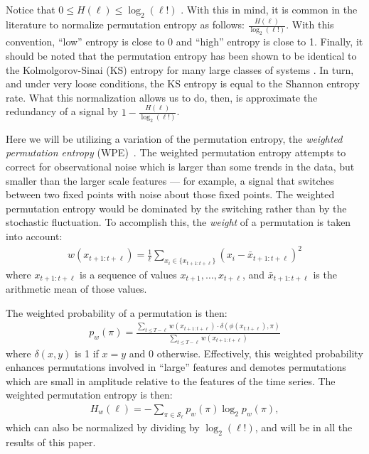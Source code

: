 Notice that $0\le H(\ell) \le \log_2(\ell!)$ \cite{bandt2002per}.  With this in mind, it is common in the literature to normalize permutation entropy as follows: $\frac{H(\ell)}{\log_2(\ell!)}$.  With this convention, ``low'' entropy is close to 0 and ``high'' entropy is close to 1. Finally, it should be noted that the permutation entropy has been shown to be identical to the Kolmolgorov-Sinai (KS) entropy for many large classes of systems \cite{amigo2012permutation}. In turn, and under very loose conditions, the KS entropy is equal to the Shannon entropy rate. What this normalization allows us to do, then, is approximate the redundancy of a signal by $1 - \frac{H(\ell)}{\log_2(\ell!)}$.

Here we will be utilizing a variation of the permutation entropy, the \emph{weighted permutation entropy} (WPE)~\cite{fadlallah2013}. The weighted permutation entropy attempts to correct for observational noise which is larger than some trends in the data, but smaller than the larger scale features --- for example, a signal that switches between two fixed points with noise about those fixed points. The weighted permutation entropy would be dominated by the switching rather than by the stochastic fluctuation. To accomplish this, the \emph{weight} of a permutation is taken into account:
\begin{align*}
  w(x_{t+1:t+\ell}) = \frac{1}{\ell} \sum_{x_i \in \{x_{t+1:t+\ell}\}}
                      \left( x_i - \bar{x}_{t+1:t+\ell} \right)^2
\end{align*}
where $x_{t+1:t+\ell}$ is a sequence of values $x_{t+1}, \ldots, x_{t+\ell}$, and $\bar{x}_{t+1:t+\ell}$ is the arithmetic mean of those values.

The weighted probability of a permutation is then:
\begin{align*}
  p_w(\pi) = \frac{\displaystyle \sum_{t \le T - \ell} w(x_{t+1:t+\ell}) \cdot \delta(\phi(x_{t:t+\ell}), \pi) }{\displaystyle \sum_{t \le T - \ell} w(x_{t+1:t+\ell})}
\end{align*}
where $\delta(x, y)$ is 1 if $x = y$ and 0 otherwise. Effectively, this weighted probability enhances permutations involved in ``large'' features and demotes permutations which are small in amplitude relative to the features of the time series. The weighted permutation entropy is then:
\begin{align*}
  H_w(\ell) = - \sum_{\pi \in \mathcal{S}_\ell} p_w(\pi) \log_2 p_w(\pi),
\end{align*}
which can also be normalized by dividing by $\log_2(\ell!)$, and will be in all the results of this paper.

